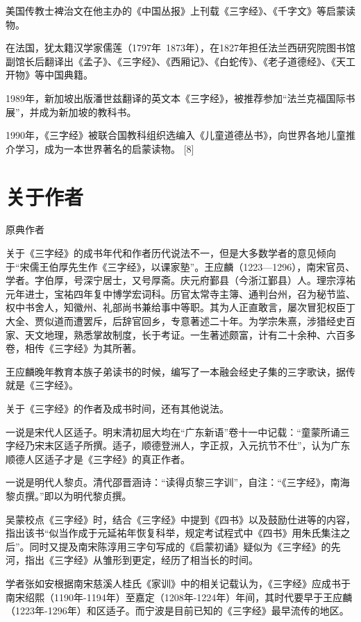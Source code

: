 \documentclass[a4paper,12pt,UTF8,twoside]{ctexbook}
\begin{document}
美国传教士裨治文在他主办的《中国丛报》上刊载《三字经》、《千字文》等启蒙读物。

在法国，犹太籍汉学家儒莲（1797年~1873年），在1827年担任法兰西研究院图书馆副馆长后翻译出《孟子》、《三字经》、《西厢记》、《白蛇传》、《老子道德经》、《天工开物》等中国典籍。

1989年，新加坡出版潘世兹翻译的英文本《三字经》，被推荐参加“法兰克福国际书展”，并成为新加坡的教科书。

1990年，《三字经》被联合国教科组织选编入《儿童道德丛书》，向世界各地儿童推介学习，成为一本世界著名的启蒙读物。 [8]

\chapter{关于作者}

原典作者

关于《三字经》的成书年代和作者历代说法不一，但是大多数学者的意见倾向于“宋儒王伯厚先生作《三字经》，以课家塾”。王应麟（1223—1296），南宋官员、学者。字伯厚，号深宁居士，又号厚斋。庆元府鄞县（今浙江鄞县）人。理宗淳祐元年进士，宝祐四年复中博学宏词科。历官太常寺主簿、通判台州，召为秘节监、权中书舍人，知徽州、礼部尚书兼给事中等职。其为人正直敢言，屡次冒犯权臣丁大全、贾似道而遭罢斥，后辞官回乡，专意著述二十年。为学宗朱熹，涉猎经史百家、天文地理，熟悉掌故制度，长于考证。一生著述颇富，计有二十余种、六百多卷，相传《三字经》为其所著。

王应麟晚年教育本族子弟读书的时候，编写了一本融会经史子集的三字歌诀，据传就是《三字经》。

关于《三字经》的作者及成书时间，还有其他说法。

一说是宋代人区适子。明末清初屈大均在“广东新语”卷十一中记载：“童蒙所诵三字经乃宋末区适子所撰。适子，顺德登洲人，字正叔，入元抗节不仕”，认为广东顺德人区适子才是《三字经》的真正作者。

一说是明代人黎贞。清代邵晋涵诗：“读得贞黎三字训”，自注：“《三字经》，南海黎贞撰。”即以为明代黎贞撰。

吴蒙校点《三字经》时，结合《三字经》中提到《四书》以及鼓励仕进等的内容，指出该书“似当作成于元延祐年恢复科举，规定考试程式中《四书》用朱氏集注之后”。同时又提及南宋陈淳用三字句写成的《启蒙初诵》疑似为《三字经》的先河，指出《三字经》从雏形到更定，经历了相当长的时间。

学者张如安根据南宋慈溪人桂氏《家训》中的相关记载认为，《三字经》应成书于南宋绍熙（1190年-1194年）至嘉定（1208年-1224年）年间，其时代要早于王应麟（1223年-1296年）和区适子。而宁波是目前已知的《三字经》最早流传的地区。
\end{document}
